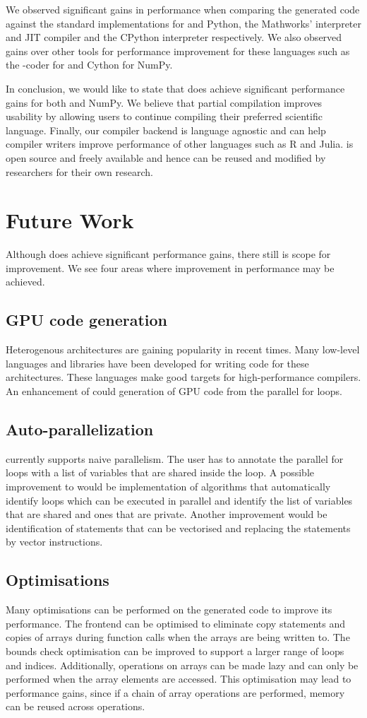We observed significant gains in performance when comparing the generated code against the standard implementations for \matlab and Python, the Mathworks' \matlab interpreter and JIT compiler and the CPython interpreter respectively. We also observed gains over other tools for performance improvement for these languages such as the \matlab-coder for \matlab and Cython for NumPy.  

In conclusion, we would like to state that \velocty does achieve significant performance gains for both \matlab and NumPy. We believe that partial compilation improves usability by allowing users to continue compiling their preferred scientific language. Finally, our compiler backend is language agnostic and can help compiler writers improve performance of other languages such as R and Julia. \velocty is open source and freely available and hence can be reused and modified by researchers for their own research. 

\section{Future Work}
Although \velocty does achieve significant performance gains, there still is scope for improvement. We see four areas where improvement in performance may be achieved.
\subsection{GPU code generation}
Heterogenous architectures are gaining popularity in recent times. Many low-level languages and libraries have been developed for writing code for these architectures. These languages make good targets for high-performance compilers. An enhancement of \velocty could generation of GPU code from the parallel for loops. 
\subsection{Auto-parallelization}
\velocty currently supports naive parallelism. The user has to annotate the parallel for loops with a list of variables that are shared inside the loop. A possible improvement to \velocty would be implementation of algorithms that automatically identify loops which can be executed in parallel and identify the list of variables that are shared and ones that are private. Another improvement would be identification of statements that can be vectorised and replacing the statements by vector instructions. 
\subsection{Optimisations}
Many optimisations can be performed on the generated code to improve its performance. The \matlab frontend can be optimised to eliminate copy statements and copies of arrays  during function calls when the arrays are being written to. The bounds check optimisation can be improved to support a larger range of loops and indices. Additionally, operations on arrays can be made lazy and can only be performed when the array elements are accessed. This optimisation may lead to performance gains, since if a chain of array operations are performed, memory can be reused across operations. 
